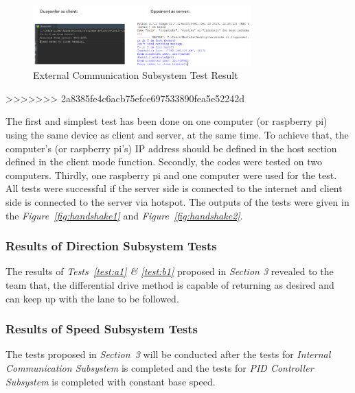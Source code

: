 \documentclass[a4paper,12pt]{article}
\begin{document}
	
	\begin{figure}[h]
		\includegraphics[width=0.75\textwidth,center]{images/hsake2}
		\caption{External Communication Subsystem Test Result \label{fig:hsake_test2} }
	\end{figure}
>>>>>>> 2a8385fe4c6acb75efce697533890fea5e52242d
	
	
	 The first and simplest test has been done on one computer (or raspberry pi) using the same device as client and server, at the same time. To achieve that, the computer's (or raspberry pi’s) IP address should be defined in the host section defined in the client mode function. Secondly, the codes were tested on two computers. Thirdly, one raspberry pi and one computer were used for the test. All tests were successful if the server side is connected to the internet and client side is connected to the server via hotspot. The outputs of the tests were given in the \textit{Figure~\ref{fig:handshake1}} and \textit{Figure~\ref{fig:handshake2}}.
	
	
	
	
	
	
	
	
	
	
	
	
	
	\subsubsection*{Results of Direction Subsystem Tests}
	
	The results of \textit{Tests~\ref{test:a1} \& \ref{test:b1}} proposed in \textit{Section 3} revealed to the team that, the differential drive method is capable of returning as desired and can keep up with the lane to be followed.
		
	
	\subsubsection*{Results of Speed Subsystem Tests}
	 
	 The tests proposed in \textit{Section~3} will be conducted after the tests for \textit{Internal Communication Subsystem} is completed and the tests for \textit{PID Controller Subsystem} is completed with constant base speed. 
	
\end{document}
